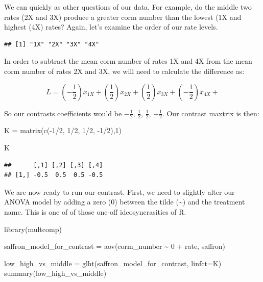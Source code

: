 \documentclass[
]{book}
\newenvironment{Shaded}{\begin{snugshade}}{\end{snugshade}}
\newcommand{\AttributeTok}[1]{\textcolor[rgb]{0.77,0.63,0.00}{#1}}
\newcommand{\DecValTok}[1]{\textcolor[rgb]{0.00,0.00,0.81}{#1}}
\newcommand{\FunctionTok}[1]{\textcolor[rgb]{0.00,0.00,0.00}{#1}}
\newcommand{\NormalTok}[1]{#1}
\newcommand{\OtherTok}[1]{\textcolor[rgb]{0.56,0.35,0.01}{#1}}
\newcommand{\SpecialCharTok}[1]{\textcolor[rgb]{0.00,0.00,0.00}{#1}}
\begin{document}
We can quickly as other questions of our data. For example, do the middle two rates (2X and 3X) produce a greater corm number than the lowest (1X and highest (4X) rates? Again, let's examine the order of our rate levels.

\begin{Shaded}
\end{Shaded}

\begin{verbatim}
## [1] "1X" "2X" "3X" "4X"
\end{verbatim}

In order to subtract the mean corm number of rates 1X and 4X from the mean corm number of rates 2X and 3X, we will need to calculate the difference as:

\[ L = (-\frac{1}{2})\bar{x}_{1X} + (\frac{1}{2})\bar{x}_{2X} + (\frac{1}{2})\bar{x}_{3X} + (- \frac{1}{2})\bar{x}_{4X} + \]

So our contrasts coefficients would be \(-\frac{1}{2}\), \(\frac{1}{2}\), \(\frac{1}{2}\), \(-\frac{1}{2}\). Our contrast maxtrix is then:

\begin{Shaded}
\begin{Highlighting}[]
\NormalTok{K }\OtherTok{=} \FunctionTok{matrix}\NormalTok{(}\FunctionTok{c}\NormalTok{(}\SpecialCharTok{{-}}\DecValTok{1}\SpecialCharTok{/}\DecValTok{2}\NormalTok{, }\DecValTok{1}\SpecialCharTok{/}\DecValTok{2}\NormalTok{, }\DecValTok{1}\SpecialCharTok{/}\DecValTok{2}\NormalTok{, }\SpecialCharTok{{-}}\DecValTok{1}\SpecialCharTok{/}\DecValTok{2}\NormalTok{),}\DecValTok{1}\NormalTok{)}

\NormalTok{K}
\end{Highlighting}
\end{Shaded}

\begin{verbatim}
##      [,1] [,2] [,3] [,4]
## [1,] -0.5  0.5  0.5 -0.5
\end{verbatim}

We are now ready to run our contrast. First, we need to slightly alter our ANOVA model by adding a zero (0) between the tilde (\textasciitilde) and the treatment name. This is one of of those one-off ideosyncrasities of R.

\begin{Shaded}
\begin{Highlighting}[]
\FunctionTok{library}\NormalTok{(multcomp)}

\NormalTok{saffron\_model\_for\_contrast }\OtherTok{=} \FunctionTok{aov}\NormalTok{(corm\_number }\SpecialCharTok{\textasciitilde{}} \DecValTok{0} \SpecialCharTok{+}\NormalTok{ rate, saffron)}

\NormalTok{low\_high\_vs\_middle }\OtherTok{=} \FunctionTok{glht}\NormalTok{(saffron\_model\_for\_contrast, }\AttributeTok{linfct=}\NormalTok{K)}
\FunctionTok{summary}\NormalTok{(low\_high\_vs\_middle)}
\end{Highlighting}
\end{Shaded}
\end{document}

